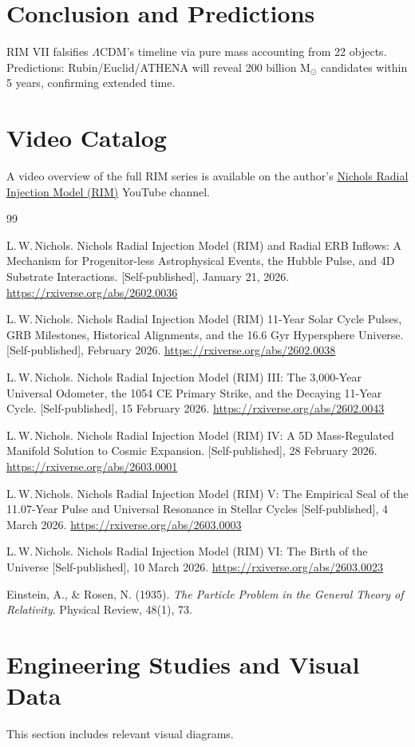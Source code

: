 \documentclass[12pt]{article}
\begin{document}
\section{Conclusion and Predictions}
RIM VII falsifies $\Lambda$CDM's timeline via pure mass accounting from 22 objects. Predictions: Rubin/Euclid/ATHENA will reveal 200 billion M$_\odot$ candidates within 5 years, confirming extended time.

\section{Video Catalog}
A video overview of the full RIM series is available on the author's \href{https://www.youtube.com/@Nichols_Thought_Experiments}{Nichols Radial Injection Model (RIM)} YouTube channel.

\begin{thebibliography}{99}

L.\,W.\,Nichols.
Nichols Radial Injection Model (RIM) and Radial ERB Inflows: A Mechanism for Progenitor-less Astrophysical Events, the Hubble Pulse, and 4D Substrate Interactions.
[Self-published], January 21, 2026.
\newline
\url{https://rxiverse.org/abs/2602.0036}

L.\,W.\,Nichols.
Nichols Radial Injection Model (RIM) 11-Year Solar Cycle Pulses, GRB Milestones, Historical Alignments, and the 16.6 Gyr Hypersphere Universe.
[Self-published], February 2026.
\newline
\url{https://rxiverse.org/abs/2602.0038}

L.\,W.\,Nichols.
Nichols Radial Injection Model (RIM) III: The 3,000-Year Universal Odometer, the 1054 CE Primary Strike, and the Decaying 11-Year Cycle.
[Self-published], 15 February 2026.
\newline
\url{https://rxiverse.org/abs/2602.0043}

L.\,W.\,Nichols.
Nichols Radial Injection Model (RIM) IV: A 5D Mass-Regulated Manifold Solution to Cosmic Expansion.
[Self-published], 28 February 2026.
\newline
\url{https://rxiverse.org/abs/2603.0001}

L.\,W.\,Nichols.
Nichols Radial Injection Model (RIM) V:
The Empirical Seal of the 11.07-Year Pulse
and Universal Resonance in Stellar Cycles
[Self-published], 4 March 2026.
\newline
\url{https://rxiverse.org/abs/2603.0003}

L.\,W.\,Nichols.
Nichols Radial Injection Model (RIM) VI:
The Birth of the Universe
[Self-published], 10 March 2026.
\newline
\url{https://rxiverse.org/abs/2603.0023}

Einstein, A., \& Rosen, N. (1935).
\textit{The Particle Problem in the General Theory of Relativity}.
Physical Review, 48(1), 73.

\end{thebibliography}

\newpage

\section{Engineering Studies and Visual Data}
This section includes relevant visual diagrams.

\end{document}
